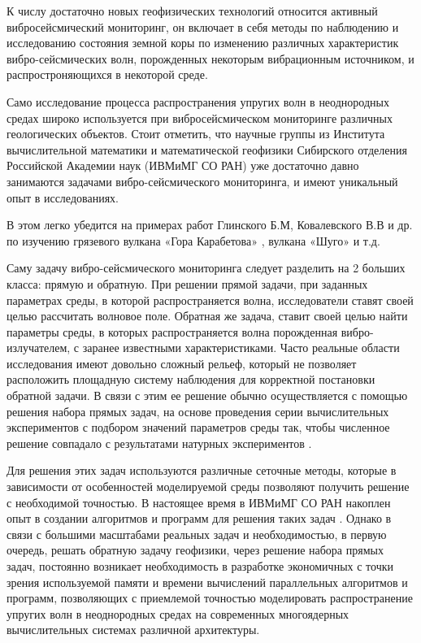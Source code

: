 
К числу достаточно новых геофизических технологий относится активный вибросейсмический мониторинг, 
он включает в себя методы по наблюдению и исследованию состояния земной коры по изменению 
различных характеристик вибро-сейсмических волн, порожденных некоторым вибрационным источником, 
и распростроняющихся в некоторой среде. 

Само исследование процесса распространения упругих волн в неоднородных средах широко
используется при вибросейсмическом мониторинге различных геологических объектов.
Стоит отметить, что научные группы из Института
вычислительной математики и математической геофизики Сибирского
отделения Российской Академии наук (ИВМиМГ СО РАН) уже достаточно давно занимаются
задачами вибро-сейсмического мониторинга, и имеют уникальный опыт в исследованиях.

В этом легко убедится на примерах работ Глинского Б.М, Ковалевского В.В и др.
по изучению грязевого вулкана «Гора Карабетова» \cite{glisnkiy-karabetov}, вулкана «Шуго» {} и т.д.

Саму задачу вибро-сейсмического мониторинга следует разделить на 2 больших класса: прямую и обратную.
При решении прямой задачи, при заданных параметрах среды, в которой распространяется волна, 
исследователи ставят своей целью рассчитать волновое поле. Обратная же задача, ставит своей целью найти параметры среды, 
в которых распространяется волна порожденная вибро-излучателем, с заранее известными характеристиками. Часто реальные области исследования имеют довольно сложный рельеф,
который не позволяет расположить площадную систему наблюдения для корректной постановки обратной задачи. В связи с этим ее решение
обычно осуществляется с помощью решения набора прямых задач, на основе проведения серии вычислительных
экспериментов с подбором значений параметров среды так, чтобы численное решение совпадало с результатами натурных экспериментов .

Для решения этих задач используются различные сеточные методы,  которые в зависимости от особенностей моделируемой среды позволяют получить решение с необходимой точностью.
В настоящее время в ИВМиМГ СО РАН накоплен опыт в создании алгоритмов и программ для решения таких задач \cite{konov, mih, ter, fat}.
Однако в связи с большими масштабами реальных задач и необходимостью, в первую очередь, решать обратную
задачу геофизики, через решение набора прямых задач, постоянно возникает необходимость в
разработке экономичных с точки зрения используемой памяти и времени вычислений
параллельных алгоритмов и программ, позволяющих с приемлемой точностью
моделировать распространение упругих волн в неоднородных средах на 
современных многоядерных вычислительных системах различной архитектуры.

